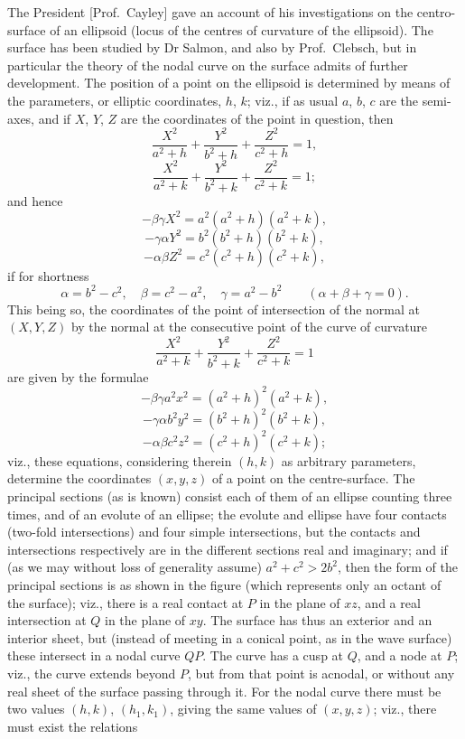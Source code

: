 \documentclass[11pt,a4paper]{article}
\begin{document}
The President [Prof.\ Cayley] gave an account of his investigations on the centro-surface of
an ellipsoid (locus of the centres of curvature of the ellipsoid). The surface has been
studied by Dr Salmon, and also by Prof.\ Clebsch, but in particular the theory of the
nodal curve on the surface admits of further development. The position of a point on the
ellipsoid is determined by means of the parameters, or elliptic coordinates, $h$, $k$;
viz., if as usual $a$, $b$, $c$ are the semi-axes, and if $X$, $Y$, $Z$ are the coordinates
of the point in question, then
\[
\frac{X^2}{a^2 + h} + \frac{Y^2}{b^2 + h} + \frac{Z^2}{c^2 + h} = 1,
\]
\[
\frac{X^2}{a^2 + k} + \frac{Y^2}{b^2 + k} + \frac{Z^2}{c^2 + k} = 1;
\]
and hence
\[
-\beta\gamma X^2 = a^2 (a^2 + h)(a^2 + k),
\]
\[
-\gamma\alpha Y^2 = b^2 (b^2 + h)(b^2 + k),
\]
\[
-\alpha\beta Z^2 = c^2 (c^2 + h)(c^2 + k),
\]
if for shortness
\[
\alpha = b^2 - c^2,\quad \beta = c^2 - a^2,\quad \gamma = a^2 - b^2\qquad (\alpha + \beta + \gamma = 0).
\]
This being so, the coordinates of the point of intersection of the normal at $(X, Y, Z)$ by
the normal at the consecutive point of the curve of curvature
\[
\frac{X^2}{a^2 + k} + \frac{Y^2}{b^2 + k} + \frac{Z^2}{c^2 + k} = 1
\]
are given by the formulae
\[
-\beta\gamma a^2 x^2 = (a^2 + h)^2 (a^2 + k),
\]
\[
-\gamma\alpha b^2 y^2 = (b^2 + h)^2 (b^2 + k),
\]
\[
-\alpha\beta c^2 z^2 = (c^2 + h)^2 (c^2 + k);
\]
viz., these equations, considering therein $(h, k)$ as arbitrary parameters, determine the
coordinates $(x, y, z)$ of a point on the centre-surface. The principal sections (as is known)
consist each of them of an ellipse counting three times, and of an evolute of an ellipse;
the evolute and ellipse have four contacts (two-fold intersections) and four simple
intersections, but the contacts and intersections respectively are in the different sections
real and imaginary; and if (as we may without loss of generality assume) $a^2 + c^2 > 2b^2$,
then the form of the principal sections is as shown in the figure (which represents only an
octant of the surface); viz., there is a real contact at $P$ in the plane of $xz$, and a
real intersection at $Q$ in the plane of $xy$. The surface has thus an exterior and an
interior sheet, but (instead of meeting in a conical point, as in the wave surface) these
intersect in a nodal curve $QP$. The curve has a cusp at $Q$, and a node at $P$; viz., the
curve extends beyond $P$, but from that point is acnodal, or without any real sheet of the
surface passing through it. For the nodal curve there must be two values $(h, k)$,
$(h_1, k_1)$, giving the same values of $(x, y, z)$; viz., there must exist the relations
\end{document}
